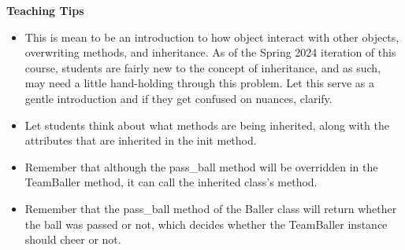\begin{blocksection}
\begin{guide}
\begin{blocksection}
\textbf{Teaching Tips}
    \begin{itemize}
    \item This is mean to be an introduction to how object interact with other objects, overwriting methods, and inheritance. As of the Spring 2024 iteration of this course, students are fairly new to the concept of inheritance, and as such, may need a little hand-holding through this problem. Let this serve as a gentle introduction and if they get confused on nuances, clarify.
    \item Let students think about what methods are being inherited, along with the attributes that are inherited in the init method.
    \item Remember that although the pass\_ball method will be overridden in the TeamBaller method, it can call the inherited class's method.
    \item Remember that the pass\_ball method of the Baller class will return whether the ball was passed or not, which decides whether the TeamBaller instance should cheer or not.
    \end{itemize}
\end{blocksection}
\end{guide}

\end{blocksection}